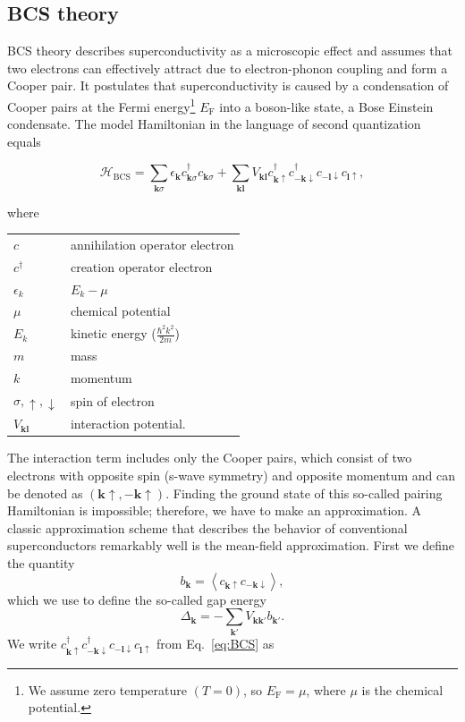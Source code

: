 \subsection{BCS theory\label{sec:BCS-theory}}

BCS theory describes superconductivity as a microscopic effect and assumes that two electrons can effectively attract due to electron-phonon coupling and form a Cooper pair.
It postulates that superconductivity is caused by a condensation of Cooper pairs at the Fermi energy\footnote{We assume zero temperature $\left(T=0\right)$, so $E_{\textrm{F}}=\mu$, where $\mu$ is the chemical potential.} $E_{\textrm{F}}$ into a boson-like state, a Bose Einstein condensate.
The model Hamiltonian in the language of second quantization equals~\cite{Gennes1999}

\begin{equation}
\mathcal{H}_{\textrm{BCS}}=\sum_{\bm{k}\sigma}\epsilon_{\bm{k}}c_{\bm{k}\sigma}^{\dagger}c_{\bm{k}\sigma}+\sum_{\bm{k}\bm{l}}V_{\bm{k}\bm{l}}c_{\bm{k}\uparrow}^{\dagger}c_{-\bm{k}\downarrow}^{\dagger}c_{-\bm{l}\downarrow}c_{\bm{l}\uparrow},\label{eq:BCS}
\end{equation}

where

\begin{tabular}{ll}
 $c$  & annihilation operator electron \tabularnewline
 $c^{\dagger}$ & creation operator electron\tabularnewline
 $\epsilon_{k}$  &  $E_{k}-\mu$\tabularnewline
$\mu$ & chemical potential\tabularnewline
$E_{k}$ & kinetic energy ($\frac{\hbar^{2}k^{2}}{2m}$)\tabularnewline
$m$ & mass\tabularnewline
 $k$  & momentum\tabularnewline
 $\sigma,\uparrow,\downarrow$  & spin of electron\tabularnewline
 $V_{\bm{kl}}$ & interaction potential.\tabularnewline
\end{tabular}


The interaction term includes only the Cooper pairs, which consist of two electrons with opposite spin (s-wave symmetry) and opposite momentum and can be denoted as $(\bm{\bm{k}}\uparrow,-\bm{k}\uparrow)$.
Finding the ground state of this so-called pairing Hamiltonian is impossible; therefore, we have to make an approximation.
A classic approximation scheme that describes the behavior of conventional superconductors remarkably well is the mean-field approximation.
First we define the quantity
\[
b_{\bm{k}}=\left\langle c_{\bm{k}\uparrow}c_{-\bm{k}\downarrow}\right\rangle ,
\]
which we use to define the so-called gap energy
\[
\Delta_{\bm{k}}=-\sum_{\bm{k'}}V_{\bm{kk'}}b_{\bm{k'}}.
\]
We write $c_{\bm{k}\uparrow}^{\dagger}c_{-\bm{k}\downarrow}^{\dagger}c_{-\bm{l}\downarrow}c_{\bm{l}\uparrow}$ from Eq.~\ref{eq:BCS} as

